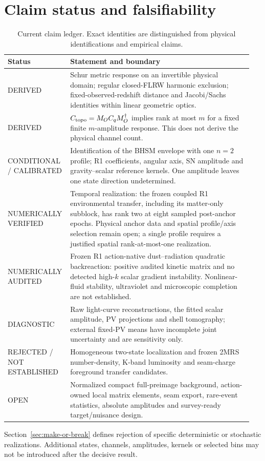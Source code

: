 \section{Claim status and falsifiability}
\label{sec:claim-status}
\begin{table}[htbp]
\centering\small
\begin{tabular}{@{}p{0.22\linewidth}p{0.73\linewidth}@{}}
\toprule
Status & Statement and boundary\\
\midrule
DERIVED & Schur metric response on an invertible physical domain;
regular closed-FLRW harmonic exclusion; fixed-observed-redshift distance
and Jacobi/Sachs identities within linear geometric optics.\\[0.5em]
DERIVED & $C_{\rm topo}=M_OC_qM_O^\dagger$ implies rank at most $m$
for a fixed finite $m$-amplitude response. This does not derive the physical
channel count.\\[0.5em]
CONDITIONAL / CALIBRATED & Identification of the BHSM envelope with one
$n=2$ profile; R1 coefficients, angular axis, SN amplitude and
gravity--scalar reference kernels. One amplitude leaves one state direction
undetermined.\\[0.5em]
NUMERICALLY VERIFIED & Temporal realization: the frozen coupled R1
environmental transfer, including its matter-only subblock, has rank two
at eight sampled post-anchor epochs. Physical anchor data and spatial
profile/axis selection remain open; a single profile requires a justified
spatial rank-at-most-one realization.\\[0.5em]
NUMERICALLY AUDITED & Frozen R1 action-native dust--radiation quadratic
backreaction: positive audited kinetic matrix and no detected high-$k$
scalar gradient instability. Nonlinear-fluid stability, ultraviolet and
microscopic completion are not established.\\[0.5em]
DIAGNOSTIC & Raw light-curve reconstructions, the fitted scalar amplitude,
PV projections and shell tomography; external fixed-PV means have incomplete
joint uncertainty and are sensitivity only.\\[0.5em]
REJECTED / NOT ESTABLISHED & Homogeneous two-state localization and frozen
2MRS number-density, K-band luminosity and seam-charge foreground transfer
candidates.\\[0.5em]
OPEN & Normalized compact full-preimage background, action-owned local
matrix elements, seam export, rare-event statistics, absolute amplitudes
and survey-ready target/nuisance design.\\
\bottomrule
\end{tabular}
\caption{Current claim ledger. Exact identities are distinguished from
physical identifications and empirical claims.}
\end{table}
Section~\ref{sec:make-or-break} defines rejection of specific deterministic
or stochastic realizations. Additional states, channels, amplitudes, kernels
or selected bins may not be introduced after the decisive result.
